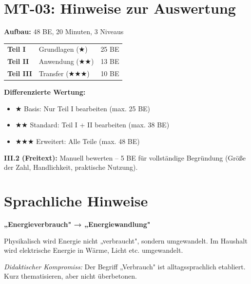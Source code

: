 \documentclass[11pt, a4paper]{article}
\begin{document}

\section*{MT-03: Hinweise zur Auswertung}

\begin{infobox}
\textbf{Aufbau:} 48 BE, 20 Minuten, 3 Niveaus

\begin{tabular}{llr}
\textbf{Teil I} & Grundlagen (★) & 25 BE \\
\textbf{Teil II} & Anwendung (★★) & 13 BE \\
\textbf{Teil III} & Transfer (★★★) & 10 BE \\
\end{tabular}

\textbf{Differenzierte Wertung:}
\begin{itemize}[leftmargin=1.5em, itemsep=2pt]
    \item ★ Basis: Nur Teil I bearbeiten (max. 25 BE)
    \item ★★ Standard: Teil I + II bearbeiten (max. 38 BE)
    \item ★★★ Erweitert: Alle Teile (max. 48 BE)
\end{itemize}

\textbf{III.2 (Freitext):} Manuell bewerten – 5 BE für vollständige Begründung (Größe der Zahl, Handlichkeit, praktische Nutzung).
\end{infobox}


\section*{Sprachliche Hinweise}

\begin{lehrerbox}
\textbf{„Energieverbrauch" → „Energiewandlung"}

Physikalisch wird Energie nicht „verbraucht", sondern umgewandelt. Im Haushalt wird elektrische Energie in Wärme, Licht etc. umgewandelt.

\textit{Didaktischer Kompromiss:} Der Begriff „Verbrauch" ist alltagssprachlich etabliert. Kurz thematisieren, aber nicht überbetonen.
\end{lehrerbox}
\end{document}
